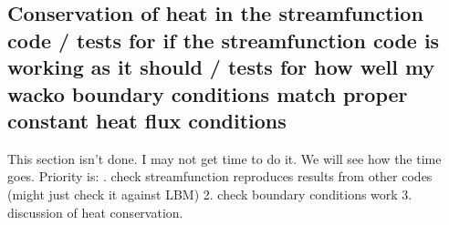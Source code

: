 \documentclass{article}
\begin{document}



\subsection*{Conservation of heat in the streamfunction code / tests for if the streamfunction code is working as it should / tests for how well my wacko boundary conditions match proper constant heat flux conditions}
This section isn't done. I may not get time to do it. We will see how the time goes. Priority is:
. check streamfunction reproduces results from other codes (might just check it against LBM)
2. check boundary conditions work
3. discussion of heat conservation.
\end{document}
